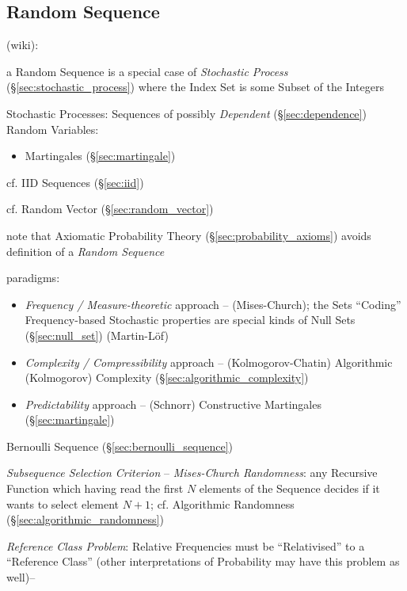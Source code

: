 \subsection{Random Sequence}\label{sec:random_sequence}

(wiki):

a Random Sequence is a special case of \emph{Stochastic Process}
(\S\ref{sec:stochastic_process}) where the Index Set is some Subset of the
Integers

Stochastic Processes: Sequences of possibly \emph{Dependent}
(\S\ref{sec:dependence}) Random Variables:
\begin{itemize}
  \item Martingales (\S\ref{sec:martingale})
\end{itemize}
cf. IID Sequences (\S\ref{sec:iid})

cf. Random Vector (\S\ref{sec:random_vector})

note that Axiomatic Probability Theory (\S\ref{sec:probability_axioms})
avoids definition of a \emph{Random Sequence}

paradigms:
\begin{itemize}
  \item \emph{Frequency / Measure-theoretic} approach -- (Mises-Church); the
    Sets ``Coding'' Frequency-based Stochastic properties are special kinds of
    Null Sets (\S\ref{sec:null_set}) (Martin-L\"of)
  \item \emph{Complexity / Compressibility} approach -- (Kolmogorov-Chatin)
    Algorithmic (Kolmogorov) Complexity (\S\ref{sec:algorithmic_complexity})
  \item \emph{Predictability} approach -- (Schnorr) Constructive Martingales
    (\S\ref{sec:martingale})
\end{itemize}

Bernoulli Sequence (\S\ref{sec:bernoulli_sequence})

\emph{Subsequence Selection Criterion} -- \emph{Mises-Church Randomness}: any
Recursive Function which having read the first $N$ elements of the Sequence
decides if it wants to select element $N+1$; cf. Algorithmic Randomness
(\S\ref{sec:algorithmic_randomness})

\emph{Reference Class Problem}: Relative Frequencies must be ``Relativised'' to
a ``Reference Class'' (other interpretations of Probability may have this
problem as well)--

